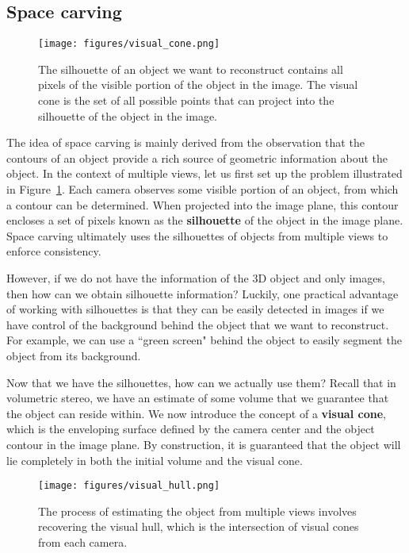 \documentclass[a4paper, 12pt]{article}
\renewcommand\emph{\textbf}
\numberwithin{equation}{section}
\begin{document}
\subsection{Space carving}
\begin{figure}[h!]
    \centering
    \texttt{[image: figures/visual\_cone.png]}
    \caption{The silhouette of an object we want to reconstruct contains all pixels of the visible portion of the object in the image. The visual cone is the set of all possible points that can project into the silhouette of the object in the image.}
    \label{fig:visual_cone}
\end{figure}
The idea of space carving is mainly derived from the observation that the contours of an object provide a rich source of geometric information about the object. In the context of multiple views, let us first set up the problem illustrated in Figure~\ref{fig:visual_cone}. Each camera observes some visible portion of an object, from which a contour can be determined. When projected into the image plane, this contour encloses a set of pixels known as the \emph{silhouette} of the object in the image plane. Space carving ultimately uses the silhouettes of objects from multiple views to enforce consistency.

However, if we do not have the information of the 3D object and only images, then how can we obtain silhouette information? Luckily, one practical advantage of working with silhouettes is that they can be easily detected in images if we have control of the background behind the object that we want to reconstruct. For example, we can use a ``green screen" behind the object to easily segment the object from its background.

Now that we have the silhouettes, how can we actually use them? Recall that in volumetric stereo, we have an estimate of some volume that we guarantee that the object can reside within. We now introduce the concept of a \emph{visual cone}, which is the enveloping surface defined by the camera center and the object contour in the image plane. By construction, it is guaranteed that the object will lie completely in both the initial volume and the visual cone. 

\begin{figure}[h!]
    \centering
    \texttt{[image: figures/visual\_hull.png]}
    \caption{The process of estimating the object from multiple views involves recovering the visual hull, which is the intersection of visual cones from each camera.}
    \label{fig:visual_hull}
\end{figure}
\end{document}
